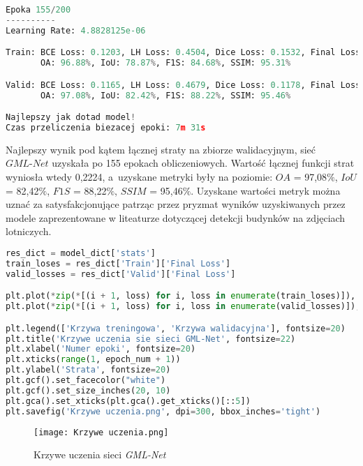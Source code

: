 \cell
\begin{lstlisting}[name=Rozdzial3.1, language=Python]
Epoka 155/200
----------
Learning Rate: 4.8828125e-06

Train: BCE Loss: 0.1203, LH Loss: 0.4504, Dice Loss: 0.1532, Final Loss: 0.2325
       OA: 96.88%, IoU: 78.87%, F1S: 84.68%, SSIM: 95.31%

Valid: BCE Loss: 0.1165, LH Loss: 0.4679, Dice Loss: 0.1178, Final Loss: 0.2224
       OA: 97.08%, IoU: 82.42%, F1S: 88.22%, SSIM: 95.46%

Najlepszy jak dotad model!
Czas przeliczenia biezacej epoki: 7m 31s
\end{lstlisting}


\cell
Najlepszy wynik pod kątem łącznej straty na zbiorze walidacyjnym, sieć $\textit{GML-Net}$ uzyskała po 155 epokach obliczeniowych. Wartość łącznej funkcji strat wyniosła wtedy 0,2224, a~uzyskane metryki były na poziomie: $\textit{OA}$ = 97,08$\%$, $\textit{IoU}$ = 82,42$\%$, $\textit{F1S}$ = 88,22$\%$, $\textit{SSIM}$ = 95,46$\%$. Uzyskane wartości metryk można uznać za satysfakcjonujące patrząc przez pryzmat wyników uzyskiwanych przez modele zaprezentowane w liteaturze dotyczącej detekcji budynków na zdjęciach lotniczych.

\cell
\begin{lstlisting}[name=Rozdzial3.1, language=Python]
res_dict = model_dict['stats']
train_loses = res_dict['Train']['Final Loss']
valid_losses = res_dict['Valid']['Final Loss']

plt.plot(*zip(*[(i + 1, loss) for i, loss in enumerate(train_loses)]), '-r')
plt.plot(*zip(*[(i + 1, loss) for i, loss in enumerate(valid_losses)]), '-b')

plt.legend(['Krzywa treningowa', 'Krzywa walidacyjna'], fontsize=20)
plt.title('Krzywe uczenia sie sieci GML-Net', fontsize=22)
plt.xlabel('Numer epoki', fontsize=20)
plt.xticks(range(1, epoch_num + 1))
plt.ylabel('Strata', fontsize=20)
plt.gcf().set_facecolor("white")
plt.gcf().set_size_inches(20, 10)
plt.gca().set_xticks(plt.gca().get_xticks()[::5])
plt.savefig('Krzywe uczenia.png', dpi=300, bbox_inches='tight')
\end{lstlisting}

\begin{figure}[!h]
    \centering \texttt{[image: Krzywe uczenia.png]}
    \captionsetup{format=hang}
    \caption{Krzywe uczenia sieci \textit{GML-Net}}
    \label{fig:learncrvs1}
\end{figure}

